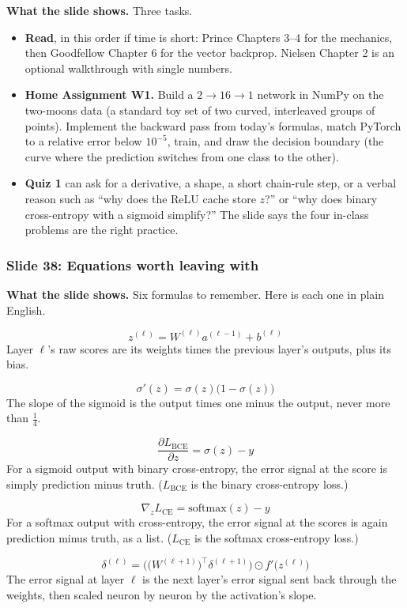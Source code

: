 \textbf{What the slide shows.} Three tasks.
\begin{itemize}
\item \textbf{Read}, in this order if time is short: Prince Chapters 3--4 for the mechanics, then Goodfellow Chapter 6 for the vector backprop. Nielsen Chapter 2 is an optional walkthrough with single numbers.
\item \textbf{Home Assignment W1.} Build a $2\to16\to1$ network in NumPy on the two-moons data (a standard toy set of two curved, interleaved groups of points). Implement the backward pass from today's formulas, match PyTorch to a relative error below $10^{-5}$, train, and draw the decision boundary (the curve where the prediction switches from one class to the other).
\item \textbf{Quiz 1} can ask for a derivative, a shape, a short chain-rule step, or a verbal reason such as ``why does the ReLU cache store $z$?'' or ``why does binary cross-entropy with a sigmoid simplify?'' The slide says the four in-class problems are the right practice.
\end{itemize}

\subsubsection{Slide 38: Equations worth leaving with}

\textbf{What the slide shows.} Six formulas to remember. Here is each one in plain English.

\[
z^{(\ell)}=W^{(\ell)}a^{(\ell-1)}+b^{(\ell)}
\]
Layer $\ell$'s raw scores are its weights times the previous layer's outputs, plus its bias.

\[
\sigma'(z)=\sigma(z)\big(1-\sigma(z)\big)
\]
The slope of the sigmoid is the output times one minus the output, never more than $\tfrac14$.

\[
\frac{\partial L_{\text{BCE}}}{\partial z}=\sigma(z)-y
\]
For a sigmoid output with binary cross-entropy, the error signal at the score is simply prediction minus truth. ($L_{\text{BCE}}$ is the binary cross-entropy loss.)

\[
\nabla_zL_{\text{CE}}=\text{softmax}(z)-y
\]
For a softmax output with cross-entropy, the error signal at the scores is again prediction minus truth, as a list. ($L_{\text{CE}}$ is the softmax cross-entropy loss.)

\[
\delta^{(\ell)}=\Big(\big(W^{(\ell+1)}\big)^\top\delta^{(\ell+1)}\Big)\odot f'\big(z^{(\ell)}\big)
\]
The error signal at layer $\ell$ is the next layer's error signal sent back through the weights, then scaled neuron by neuron by the activation's slope.

